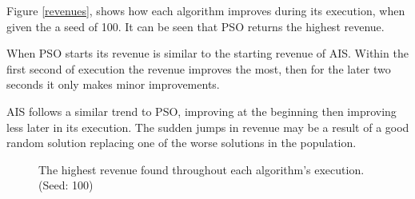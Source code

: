 \documentclass{article}
\begin{document}
Figure \ref{revenues}, shows how each algorithm improves during its execution, when given the a seed of 100. It can be seen that PSO returns the highest revenue. 

When PSO starts its revenue is similar to the starting revenue of AIS. Within the first second of execution the revenue improves the most, then for the later two seconds it only makes minor improvements.

AIS follows a similar trend to PSO, improving at the beginning then improving less later in its execution. The sudden jumps in revenue may be a result of a good random solution replacing one of the worse solutions in the population.

\begin{figure}[h]
\centering

\caption{The highest revenue found throughout each algorithm's execution. (Seed: 100)}
\end{figure}
\end{document}
